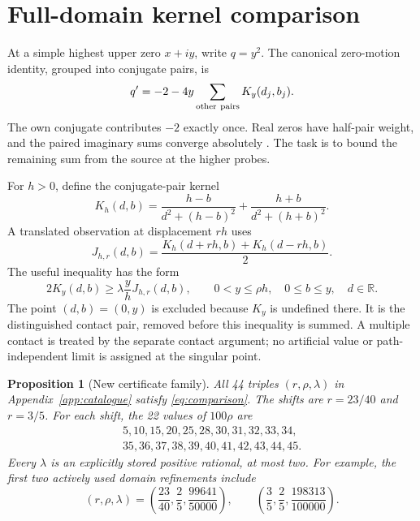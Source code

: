 \documentclass[11pt,a4paper]{article}
\newtheorem{proposition}[theorem]{Proposition}
\theoremstyle{definition}\newtheorem{definition}[theorem]{Definition}
\theoremstyle{remark}\newtheorem{remark}[theorem]{Remark}
\begin{document}
\section{Full-domain kernel comparison}\label{sec:kernel}
At a simple highest upper zero $x+iy$, write $q=y^2$. The canonical
zero-motion identity, grouped into conjugate pairs, is
\begin{equation}\label{eq:motion}
 q'=-2-4y\sum_{\rm other\ pairs}K_y(d_j,b_j).
\end{equation}
The own conjugate contributes $-2$ exactly once. Real zeros have half-pair
weight, and the paired imaginary sums converge absolutely
\cite[Proposition 3.1]{polymath}. The task is to bound the remaining sum
from the source at the higher probes.

For $h>0$, define the conjugate-pair kernel
\begin{equation}\label{eq:kernel}
 K_h(d,b)=\frac{h-b}{d^2+(h-b)^2}
          +\frac{h+b}{d^2+(h+b)^2}.
\end{equation}
A translated observation at displacement $rh$ uses
\[
 J_{h,r}(d,b)=\frac{K_h(d+rh,b)+K_h(d-rh,b)}2.
\]
The useful inequality has the form
\begin{equation}\label{eq:comparison}
 2K_y(d,b)\ge\lambda\frac yh J_{h,r}(d,b),
 \qquad 0<y\le\rho h,\quad 0\le b\le y,\quad d\in\mathbb R.
\end{equation}
The point $(d,b)=(0,y)$ is excluded because $K_y$ is undefined there.
It is the distinguished contact pair, removed before this inequality is
summed. A multiple contact is treated by the separate contact argument;
no artificial value or path-independent limit is assigned at the singular
point.

\begin{proposition}[New certificate family]\label{prop:kernels}
All 44 triples $(r,\rho,\lambda)$ in Appendix~\ref{app:catalogue} satisfy
\eqref{eq:comparison}. The shifts are $r=23/40$ and $r=3/5$.
For each shift, the 22 values of $100\rho$ are
\[
 \begin{gathered}
 5,10,15,20,25,28,30,31,32,33,34,\\
 35,36,37,38,39,40,41,42,43,44,45.
 \end{gathered}
\]
Every $\lambda$ is an explicitly stored positive rational, at most two.
For example, the first two actively used domain refinements include
\[
 (r,\rho,\lambda)=\left(\frac{23}{40},\frac25,\frac{99641}{50000}\right),
 \qquad\left(\frac35,\frac25,\frac{198313}{100000}\right).
\]
\end{proposition}
\end{document}
